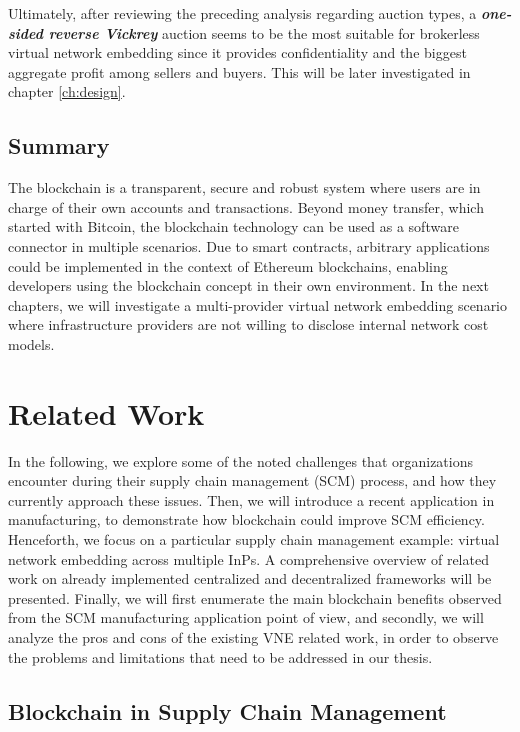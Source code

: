 Ultimately, after reviewing the preceding analysis regarding auction types, a \textbf{\textit{one-sided reverse Vickrey}} auction seems to be the most suitable for brokerless virtual network embedding since it provides confidentiality and the biggest aggregate profit among sellers and buyers. This will be later investigated in chapter \ref{ch:design}.

\section{Summary}

The blockchain is a transparent, secure and robust system where users are in charge of their own accounts and transactions. Beyond money transfer, which started with Bitcoin, the blockchain technology can be used as a software connector in multiple scenarios. Due to smart contracts, arbitrary applications could be implemented in the context of Ethereum blockchains, enabling developers using the blockchain concept in their own environment. In the next chapters, we will investigate a multi-provider virtual network embedding scenario where infrastructure providers are not willing to disclose internal network cost models.

\chapter{Related Work}
\label{ch:relatedwork}

In the following, we explore some of the noted challenges that organizations encounter during their supply chain management (SCM) process, and how they currently approach these issues. Then, we will introduce a recent application in manufacturing, to demonstrate how blockchain could improve SCM efficiency. Henceforth, we focus on a particular supply chain management example: virtual network embedding across multiple InPs. A comprehensive overview of related work on already implemented centralized and decentralized frameworks will be presented. Finally, we will first enumerate the main blockchain benefits observed from the SCM manufacturing application point of view, and secondly, we will analyze the pros and cons of the existing VNE related work, in order to observe the problems and limitations that need to be addressed in our thesis.

\section{Blockchain in Supply Chain Management}

